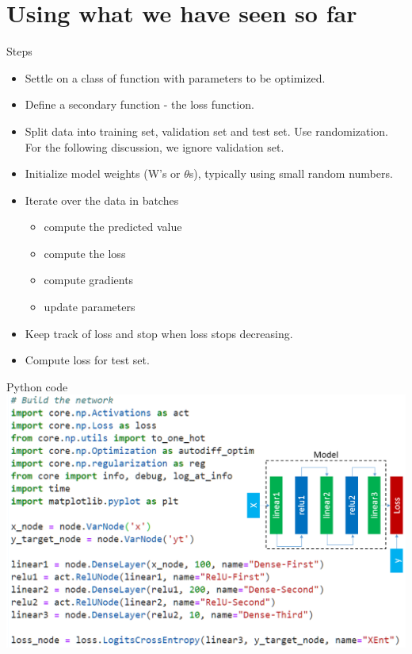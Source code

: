 \section{Using what we have seen so far}
\begin{frame}{Steps}
	\begin{itemize}
		\item Settle on a class of function with parameters  to be optimized. 
		 
		\item Define a secondary function - the loss function.  
		 
		\item Split data into  training set, validation set and test 
		set. Use randomization. For the following discussion, we ignore validation set. 
		
		\item Initialize model weights (W's or $\theta$s), typically using 
		small random numbers.
	  
		\item Iterate over the data in batches  
		\begin{itemize}
			\item compute the predicted value
			\item compute the loss 
			\item compute gradients 
			\item update parameters
		\end{itemize}
		\item Keep track of loss and stop when loss stops decreasing.
		\item Compute loss for test set.   
	\end{itemize}
\end{frame}

\begin{frame}{Python code}
		\includegraphics[width=.9\textwidth, center]{figuras/3layer_autodiff_example_with_network.png}	
\end{frame}

